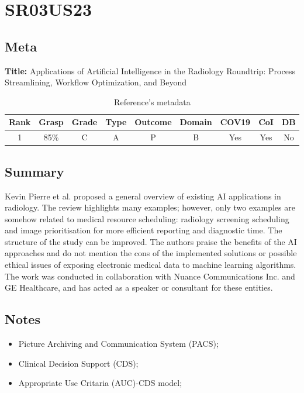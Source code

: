 \section{ SR03US23 }


\subsection{Meta}

    \textbf{Title:}
    Applications of Artificial Intelligence in the Radiology Roundtrip: Process Streamlining, Workflow Optimization, and Beyond

    \begin{table}[H]
        \centering
        \begin{tabular}{|c|c|c|c|c|c|c|c|c|}
            \hline
                \textbf{Rank} & \textbf{Grasp} & \textbf{Grade} & \textbf{Type} & \textbf{Outcome} & \textbf{Domain} & \textbf{COV19} & \textbf{CoI} & \textbf{DB} \\
            \hline
                1 & 85\% & C & A & P & B & Yes & Yes & No \\
            \hline
        \end{tabular}
        \caption{Reference's metadata}
        \label{tab:SR03US23}
    \end{table}

\subsection{Summary}
    Kevin Pierre et al. \cite{x076} proposed a general overview of existing AI applications in radiology. The review highlights many examples; however, only two examples are somehow related to medical resource scheduling: radiology screening scheduling and image prioritisation for more efficient reporting and diagnostic time. The structure of the study can be improved. The authors praise the benefits of the AI approaches and do not mention the cons of the implemented solutions or possible ethical issues of exposing electronic medical data to machine learning algorithms. The work was conducted in collaboration with Nuance Communications Inc. and GE Healthcare, and has acted as a speaker or consultant for these entities.

\subsection{Notes}
    \begin{itemize}
        \item Picture Archiving and Communication System (PACS);
        \item Clinical Decision Support (CDS);
        \item Appropriate Use Critaria (AUC)-CDS model;
    \end{itemize}


